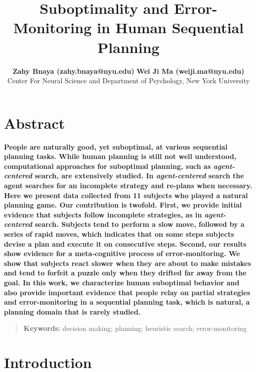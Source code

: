 \documentclass[10pt,letterpaper]{article}
\title{Suboptimality and Error-Monitoring in Human Sequential Planning}
\author{{\large \bf Zahy Bnaya (zahy.bnaya@nyu.edu)} {\large \bf Wei Ji Ma (weiji.ma@nyu.edu)} \\
Center For Neural Science and Department of Psychology, New York University\\
}
\begin{document}
\maketitle

\section{Abstract}

{\bf
People are naturally good, yet suboptimal, at various sequential planning tasks. While human planning is still not well understood, computational approaches for suboptimal planning, such as \emph{agent-centered} search, are extensively studied. In \emph{agent-centered} search the agent searches for an incomplete strategy and re-plans when necessary. Here we present data collected from 11 subjects who played a natural planning game. Our contribution is twofold. First, we provide initial evidence that subjects follow incomplete strategies, as in \emph{agent-centered} search. Subjects tend to perform a slow move, followed by a series of rapid moves, which indicates that on some steps subjects devise a plan and execute it on consecutive steps. 
Second, our results show evidence for a meta-cognitive process of error-monitoring.  We show that subjects react slower when they are about to make mistakes and tend to forfeit a puzzle only when they drifted far away from the goal. 
In this work, we characterize human suboptimal behavior and also provide important evidence that people relay on partial strategies and error-monitoring in a sequential planning task, which is natural, a planning domain that is rarely studied.
}
\begin{quote}
\small
\textbf{Keywords:} 
decision making; planning; heuristic search; error-monitoring
\end{quote}


\vspace{-0.5cm}
\section{Introduction}
\end{document}
